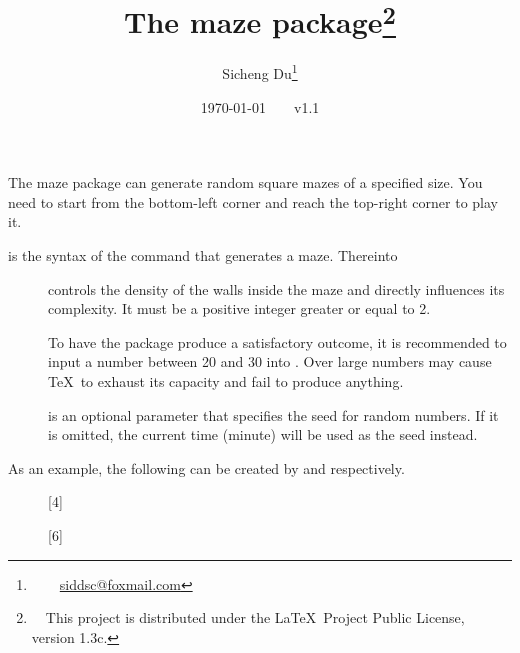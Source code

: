 \documentclass{ltxdoc}
\title{The \textsf{maze} package\footnote{~~This project is distributed under the \LaTeX~Project Public License, version 1.3c.}}
\author{Sicheng Du\thanks{~~\Letter~~\href{mailto:siddsc@foxmail.com}{siddsc@foxmail.com}}}
\date{\today~~~~v1.1}
\begin{document}
\maketitle
The \textsf{maze} package can generate random square mazes of a specified size. You need to start from the bottom-left corner and reach the top-right corner to play it.
\begin{macro}{\maze}
 is the syntax of the command that generates a maze. Thereinto
\begin{description}
\item[] controls the density of the walls inside the maze and directly influences its complexity. It must be a positive integer greater or equal to 2.

To have the package produce a satisfactory outcome, it is recommended to input a number between 20 and 30 into . Over large numbers may cause \TeX~to exhaust its capacity and fail to produce anything.
\item[] is an optional parameter that specifies the seed for random numbers. If it is omitted, the current time (minute) will be used as the seed instead.
\end{description}\end{macro}

As an example, the following can be created by  and  respectively.
\begin{figure}[h]
\begin{minipage}{.5\textwidth}
[4]
\end{minipage}\hfill
\begin{minipage}{.5\textwidth}
[6]
\end{minipage}
\end{figure}
\eject
\end{document}
